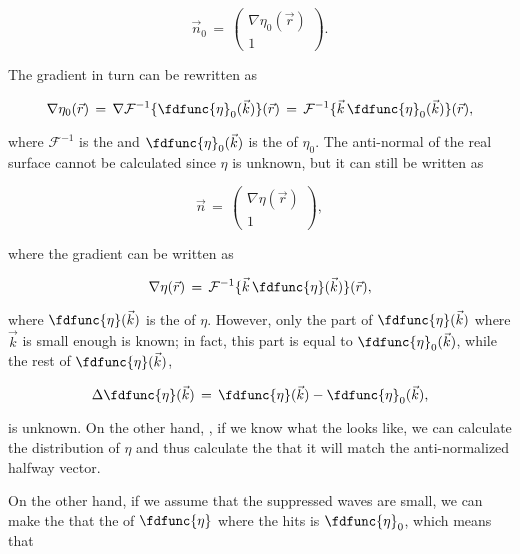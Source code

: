 {\begin{equation}
\vec{n}_0 \,=\, \left(\!\!\!\begin{array}{c}\nabla\eta_0(\vec{r}) \\ 1\end{array}\!\!\!\right).
\end{equation}

The gradient in turn can be rewritten as

\begin{equation}
\nabla\eta_0(\vec{r}) \,=\, \nabla\mathcal{F}^{-1}\{\fdfunc{\eta}_0(\vec{k})\}(\vec{r}) \,=\, \mathcal{F}^{-1}\{\vec{k}\,\fdfunc{\eta}_0(\vec{k})\}(\vec{r}),
\end{equation}

where $\mathcal{F}^{-1}$ is the  and $\fdfunc{\eta}_0(\vec{k})$ is the  of $\eta_0$. The anti-normal of the real surface cannot be calculated since $\eta$ is unknown, but it can still be written as

\begin{equation}
\vec{n} \,=\, \left(\!\!\!\begin{array}{c}\nabla\eta(\vec{r}) \\ 1\end{array}\!\!\!\right),
\end{equation}

where the gradient can be written as

\begin{equation}
\nabla\eta(\vec{r}) \,=\, \mathcal{F}^{-1}\{\vec{k}\,\fdfunc{\eta}(\vec{k})\}(\vec{r}),
\end{equation}

where $\fdfunc{\eta}(\vec{k})$ is the  of $\eta$. However, only the part of $\fdfunc{\eta}(\vec{k})$ where $\vec{k}$ is small enough is known; in fact, this part is equal to $\fdfunc{\eta}_0(\vec{k})$, while the rest of $\fdfunc{\eta}(\vec{k})$,

\begin{equation}
\Delta\fdfunc{\eta}(\vec{k}) \,=\, \fdfunc{\eta}(\vec{k}) - \fdfunc{\eta}_0(\vec{k}),
\end{equation}

is unknown. On the other hand, , if we know what the  looks like, we can calculate the distribution of $\eta$ and thus calculate the  that it will match the anti-normalized halfway vector.

On the other hand, if we assume that the suppressed waves are small, we can make the \approximation that the  of $\fdfunc{\eta}$ where the  hits is $\fdfunc{\eta}_0$, which means that

}
